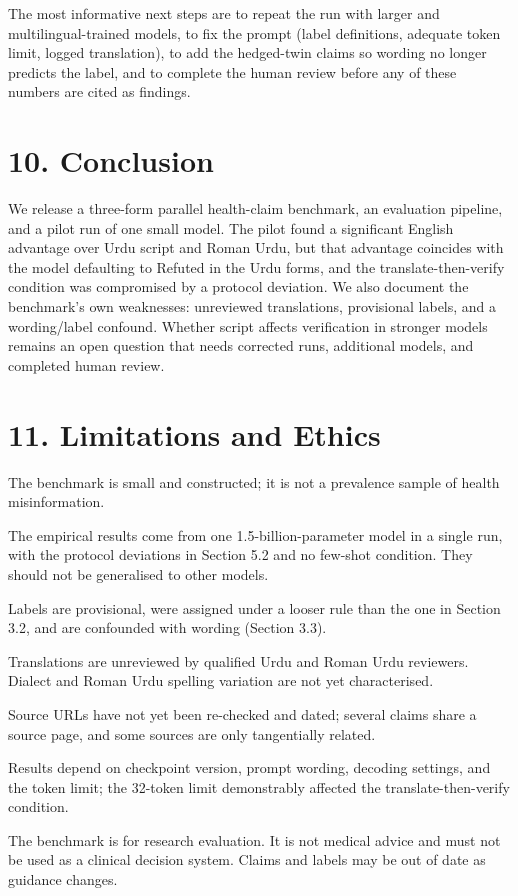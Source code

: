 \documentclass[10pt,a4paper]{article}
\begin{document}
The most informative next steps are to repeat the run with larger and multilingual-trained models, to fix the prompt (label definitions, adequate token limit, logged translation), to add the hedged-twin claims so wording no longer predicts the label, and to complete the human review before any of these numbers are cited as findings.

\section{10. Conclusion}
We release a three-form parallel health-claim benchmark, an evaluation pipeline, and a pilot run of one small model. The pilot found a significant English advantage over Urdu script and Roman Urdu, but that advantage coincides with the model defaulting to Refuted in the Urdu forms, and the translate-then-verify condition was compromised by a protocol deviation. We also document the benchmark's own weaknesses: unreviewed translations, provisional labels, and a wording/label confound. Whether script affects verification in stronger models remains an open question that needs corrected runs, additional models, and completed human review.

\section{11. Limitations and Ethics}
The benchmark is small and constructed; it is not a prevalence sample of health misinformation.

The empirical results come from one 1.5-billion-parameter model in a single run, with the protocol deviations in Section 5.2 and no few-shot condition. They should not be generalised to other models.

Labels are provisional, were assigned under a looser rule than the one in Section 3.2, and are confounded with wording (Section 3.3).

Translations are unreviewed by qualified Urdu and Roman Urdu reviewers. Dialect and Roman Urdu spelling variation are not yet characterised.

Source URLs have not yet been re-checked and dated; several claims share a source page, and some sources are only tangentially related.

Results depend on checkpoint version, prompt wording, decoding settings, and the token limit; the 32-token limit demonstrably affected the translate-then-verify condition.

The benchmark is for research evaluation. It is not medical advice and must not be used as a clinical decision system. Claims and labels may be out of date as guidance changes.
\end{document}
